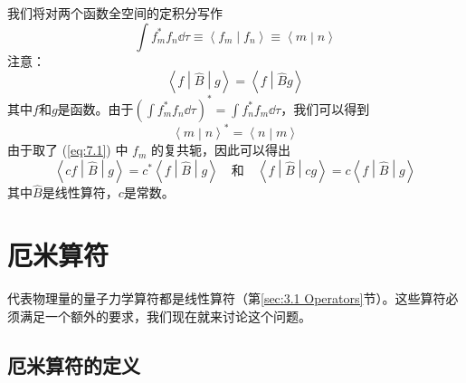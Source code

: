     我们将对两个函数全空间的定积分写作
    \begin{equation}
        \int f^{\ast}_m f_n \dd \tau \equiv \left\langle f_m \middle| f_n \right\rangle \equiv \left\langle m \middle| n \right\rangle
        \label{eq:7.3}
    \end{equation}
    注意：
    \begin{equation*}
        \left\langle f \middle| \hat{B} \middle| g \right\rangle = \left\langle f \middle| \hat{B} g \right\rangle
    \end{equation*}
    其中$f$和$g$是函数。由于$\left(\int f^{\ast}_mf_n\dd \tau\right)^{\ast} = \int f^{\ast}_nf_m\dd \tau$，我们可以得到
    \begin{equation}
        \boxed{
            \left\langle m \middle| n \right\rangle^{\ast} = \left\langle n \middle| m \right\rangle
        }
        \label{eq:7.4}
    \end{equation}
    由于取了 (\ref{eq:7.1}) 中 $f_m$ 的复共轭，因此可以得出
    \begin{equation}
        \boxed{
            \left\langle cf \middle| \hat{B} \middle| g \right\rangle = c^{\ast} \left\langle f \middle| \hat{B} \middle| g \right\rangle \quad \text{和} \quad \left\langle f \middle| \hat{B} \middle| cg \right\rangle = c \left\langle f \middle| \hat{B} \middle| g \right\rangle
        }
        \label{eq:7.5}
    \end{equation}
    其中$\hat{B}$是线性算符，$c$是常数。

\section{厄米算符}
\label{sec:7.2 Hermitian Operators}
    代表物理量的量子力学算符都是线性算符（第\ref{sec:3.1 Operators}节）。这些算符必须满足一个额外的要求，我们现在就来讨论这个问题。

\subsection*{厄米算符的定义}

